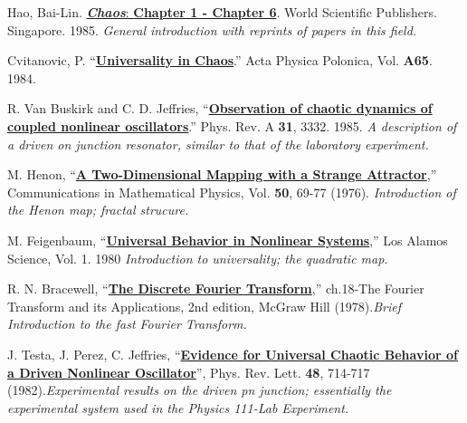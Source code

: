 \documentclass{../lab}
\begin{document}
\begin{thebibliography}{}
     Hao, Bai-Lin. \href{https://berkeley-physics111b.github.io/assets/pdf/oldwebsitestructure/NLD/References/02-Chaos.pdf}{\emph{\textbf{Chaos}}: \textbf{Chapter 1 - Chapter 6}}. World Scientific Publishers. Singapore. 1985.
    \newline\emph{General introduction with reprints of papers in this field.}

     Cvitanovic, P. ``\href{https://berkeley-physics111b.github.io/assets/pdf/oldwebsitestructure/NLD/References/03-Universality_in_Chaos.pdf}{\textbf{Universality in Chaos}}.'' Acta Physica Polonica, Vol. \textbf{A65}. 1984.

     R. Van Buskirk and C. D. Jeffries, ``\href{https://berkeley-physics111b.github.io/assets/pdf/oldwebsitestructure/NLD/References/09-Observation_of_Chaotic_Dynamics.pdf}{\textbf{Observation of chaotic dynamics of coupled nonlinear oscillators}}.'' Phys. Rev. A \textbf{31}, 3332. 1985.
    \newline\emph{A description of a driven on junction resonator, similar to that of the laboratory experiment.}

     M. Henon, ``\href{https://drive.google.com/file/d/13ISacKyMSSYAb6oxR8eBSpLLloKhzVfR/view?usp=drive_link}{\textbf{A Two-Dimensional Mapping with a Strange Attractor}},'' Communications in Mathematical Physics, Vol. \textbf{50}, 69-77 (1976). 
    \newline\emph{Introduction of the Henon map; fractal strucure.}

     M. Feigenbaum, ``\href{https://drive.google.com/file/d/1JQTtmROTCWXRLSmocZCK_pRND8INjS8U/view?usp=drive_link}{\textbf{Universal Behavior in Nonlinear Systems}},'' Los Alamos Science, Vol. 1. 1980 \newline\emph{Introduction to universality; the quadratic map.}

     R. N. Bracewell, ``\href{https://drive.google.com/file/d/1GvsEatHDe1n5rHDWPH3-f1nnuppJ4tHC/view?usp=drive_link}{\textbf{The Discrete Fourier Transform}},'' ch.18-The Fourier Transform and its Applications, 2nd edition, McGraw Hill (1978).\emph{Brief Introduction to the fast Fourier Transform.}

     J. Testa, J. Perez, C. Jeffries, ``\href{https://drive.google.com/file/d/1WE4noAb0kMf3UqEcxjMlNYZyEQruETOV/view?usp=drive_link}{\textbf{Evidence for Universal Chaotic Behavior of a Driven Nonlinear Oscillator}}'', Phys. Rev. Lett. \textbf{48}, 714-717 (1982).\emph{Experimental results on the driven pn junction; essentially the experimental system used in the Physics 111-Lab Experiment.}


\end{thebibliography}
\end{document}
